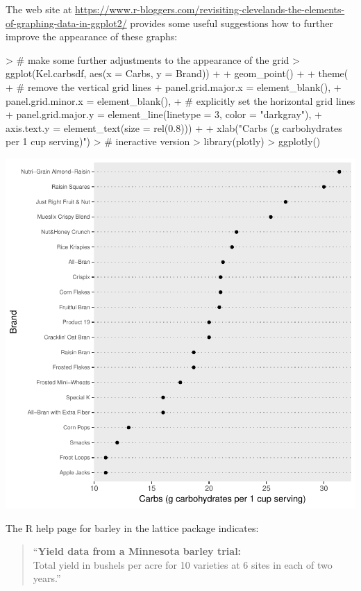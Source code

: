 The web site at \url{https://www.r-bloggers.com/revisiting-clevelands-the-elements-of-graphing-data-in-ggplot2/}
provides some useful suggestions how to further improve the appearance of these graphs:

\begin{Schunk}
\begin{Sinput}
> # make some further adjustments to the appearance of the grid
> ggplot(Kel.carbsdf, aes(x = Carbs, y = Brand)) +
+   geom_point() +
+   theme( 
+     # remove the vertical grid lines
+     panel.grid.major.x = element_blank(),
+     panel.grid.minor.x = element_blank(),
+     # explicitly set the horizontal grid lines
+     panel.grid.major.y = element_line(linetype = 3, color = "darkgray"),
+     axis.text.y = element_text(size = rel(0.8))) +
+   xlab("Carbs (g carbohydrates per 1 cup serving)")
> # ineractive version
> library(plotly)
> ggplotly()
\end{Sinput}
\end{Schunk}
\includegraphics{lect_chapter5_v2-024}


\newpage


The R help page for barley in the lattice package indicates:
\begin{quotation}
\noindent
``{\bf Yield data from a Minnesota barley trial:} \\[0.2cm]
%
Total yield in bushels per acre for 10 varieties at 6 sites in each of two years.''
\end{quotation}


